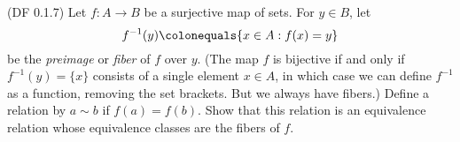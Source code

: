 

\begin{problem}{\textsf{(DF 0.1.7)}}
  Let $f \colon A \to B$ be a surjective map of sets.  For $y \in B$, let
  \[ f^{-1}(y) \colonequals \{x \in A : f(x) = y\} \]
  be the \emph{preimage} or \emph{fiber} of $f$ over $y$.  (The map $f$ is bijective 
  if and only if $f^{-1}(y)=\{x\}$ consists of a single element $x \in A$, in which 
  case we can define $f^{-1}$ as a function, removing the set brackets.  But we 
  always have fibers.)
  Define a relation by $a \sim b$ if $f(a)=f(b)$.  Show that this relation is an 
  equivalence relation whose equivalence classes are the fibers of $f$.
\end{problem}
\begin{Answer}
  
\end{Answer}
